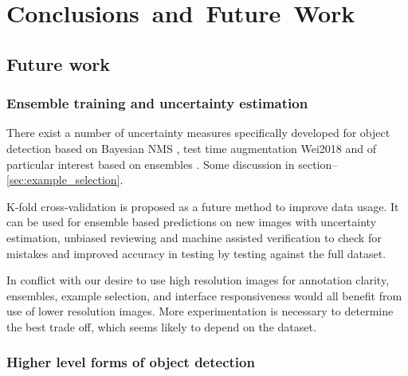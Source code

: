 \chapter{Conclusions~and~Future~Work}
\label{chap:future} 


\section{Future work}
\subsection{Ensemble training and uncertainty estimation}

There exist a number of uncertainty measures specifically developed for object detection based on Bayesian \gls{NMS} \cite{Harakeh}, test time augmentation {Wei2018} and of particular interest based on ensembles \cite{Le2018}. Some discussion in section--\ref{sec:example_selection}. 

K-fold cross-validation is proposed as a future method to improve data usage. It can be used for ensemble based predictions on new images with uncertainty estimation, unbiased reviewing and machine assisted verification to check for mistakes and improved accuracy in testing by testing against the full dataset.

In conflict with our desire to use high resolution images for annotation clarity, ensembles, example selection, and interface responsiveness would all benefit from use of lower resolution images. More experimentation is necessary to determine the best trade off, which seems likely to depend on the dataset.



\subsection{Higher level forms of object detection}

